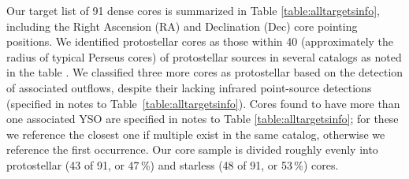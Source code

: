 \documentclass[iop,twocolappendix]{emulateapj}
\begin{document}
Our target list of 91 dense cores is summarized in Table \ref{table:alltargetsinfo}, including the Right Ascension (RA) and Declination (Dec) core pointing positions. We identified protostellar cores as those within 40{\arcsec} (approximately  the radius of typical Perseus cores) of protostellar sources in several catalogs as noted in the table \citep{Jorgensen2007, Enoch2009, Dunham2015}. We classified three more cores as protostellar based on the detection of associated outflows, despite their lacking infrared point-source detections \citep{Chen2010, Pineda2011, Schnee2012} (specified in notes to Table~\ref{table:alltargetsinfo}). Cores found to have more than one associated YSO are specified in notes to Table \ref{table:alltargetsinfo}; for these we reference the closest one if multiple exist in the same catalog, otherwise we reference the first occurrence. Our core sample is divided roughly evenly into protostellar (43 of 91, or 47\,\%) and starless (48 of 91, or 53\,\%) cores.
\end{document}

